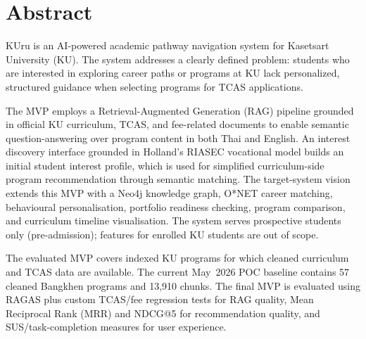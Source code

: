 \chapter*{Abstract}
\label{chap:abstract}

KUru is an AI-powered academic pathway navigation system for Kasetsart University (KU). The system addresses a clearly defined problem: students who are interested in exploring career paths or programs at KU lack personalized, structured guidance when selecting programs for TCAS applications.

The MVP employs a Retrieval-Augmented Generation (RAG) pipeline grounded in official KU curriculum, TCAS, and fee-related documents to enable semantic question-answering over program content in both Thai and English. An interest discovery interface grounded in Holland's RIASEC vocational model builds an initial student interest profile, which is used for simplified curriculum-side program recommendation through semantic matching. The target-system vision extends this MVP with a Neo4j knowledge graph, O*NET career matching, behavioural personalisation, portfolio readiness checking, program comparison, and curriculum timeline visualisation. The system serves prospective students only (pre-admission); features for enrolled KU students are out of scope.

The evaluated MVP covers indexed KU programs for which cleaned curriculum and TCAS data are available. The current May~2026 POC baseline contains 57 cleaned Bangkhen programs and 13,910 chunks. The final MVP is evaluated using RAGAS plus custom TCAS/fee regression tests for RAG quality, Mean Reciprocal Rank (MRR) and NDCG@5 for recommendation quality, and SUS/task-completion measures for user experience.


\vspace{.2in}
\begin{flushright}
    \usevar{\srsAuthorOne} \\
    \usevar{\srsAuthorTwo}
\end{flushright}
